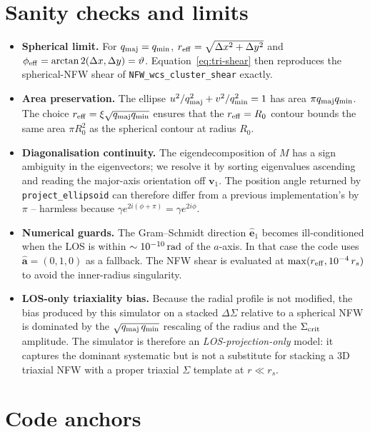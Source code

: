 \documentclass[11pt,a4paper]{article}
\newcommand{\DS}{\Delta\Sigma}
\newcommand{\unitvec}[1]{\hat{\mathbf{#1}}}
\newcommand{\Reff}{r_{\rm eff}}
\begin{document}
\section{Sanity checks and limits}

\begin{itemize}
\item \textbf{Spherical limit.} For $q_{\rm maj} = q_{\rm min}$,
      $\Reff = \sqrt{\Delta x^2 + \Delta y^2}$ and
      $\phi_{\rm eff} = \arctan2(\Delta x, \Delta y) = \vartheta$.
      Equation~\eqref{eq:tri-shear} then reproduces the spherical-NFW
      shear of \texttt{NFW\_wcs\_cluster\_shear} exactly.
\item \textbf{Area preservation.} The ellipse
      $u^2/q_{\rm maj}^2 + v^2/q_{\rm min}^2 = 1$ has area
      $\pi q_{\rm maj}q_{\rm min}$. The choice
      $\Reff = \xi\sqrt{q_{\rm maj}q_{\rm min}}$ ensures that the
      $\Reff = R_0$ contour bounds the same area
      $\pi R_0^2$ as the spherical contour at radius $R_0$.
\item \textbf{Diagonalisation continuity.} The eigendecomposition of
      $M$ has a sign ambiguity in the eigenvectors; we resolve it by
      sorting eigenvalues ascending and reading the major-axis
      orientation off $\mathbf{v}_1$. The position angle returned by
      \texttt{project\_ellipsoid} can therefore differ from a previous
      implementation's by $\pi$ -- harmless because
      $\gamma e^{2 i (\phi+\pi)} = \gamma e^{2 i \phi}$.
\item \textbf{Numerical guards.} The Gram--Schmidt direction $\unitvec{e}_1$
      becomes ill-conditioned when the LOS is within
      $\sim 10^{-10}\,{\rm rad}$ of the $a$-axis. In that case the code
      uses $\unitvec{a}=(0,1,0)$ as a fallback. The NFW shear is
      evaluated at $\max(\Reff, 10^{-4}\,r_s)$ to avoid the inner-radius
      singularity.
\item \textbf{LOS-only triaxiality bias.} Because the radial profile is
      not modified, the bias produced by this simulator on a stacked
      $\DS$ relative to a spherical NFW is dominated by the
      $\sqrt{q_{\rm maj}\,q_{\rm min}}$ rescaling of the radius and the
      $\Sigma_{\rm crit}$ amplitude. The simulator is therefore an
      \emph{LOS-projection-only} model: it captures the dominant
      systematic but is not a substitute for stacking a 3D triaxial NFW
      with a proper triaxial $\Sigma$ template at $r \ll r_s$.
\end{itemize}

\section{Code anchors}
\end{document}
